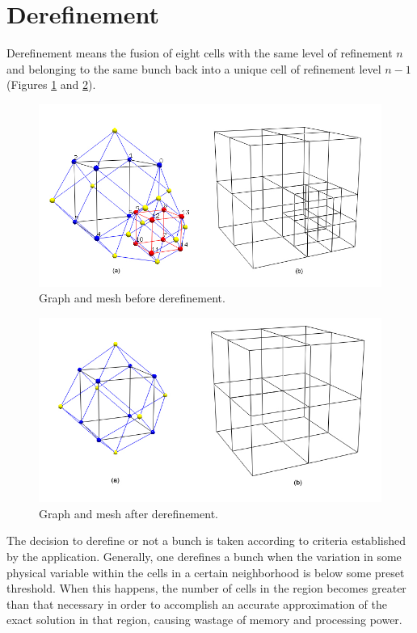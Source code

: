 \section{Derefinement} \label{SEC_DEREFINEMENT}

Derefinement means the fusion of eight cells with the same level of
refinement $n$ and belonging to the same bunch back into a unique
cell of refinement level $n - 1$ (Figures
\ref{FIG_BEFORE_DEREFINEMENT} and \ref{FIG_AFTER_DEREFINEMENT}).

\begin{figure}[H]
    \centering
    \includegraphics[scale=0.40]{../img/refinedGraphAndGrid.jpg}
    \caption{Graph and mesh before derefinement.}
    \label{FIG_BEFORE_DEREFINEMENT}
\end{figure}

\begin{figure}
    \centering
    \includegraphics[scale=0.40]{../img/initialGraphAndGrid.jpg}
    \caption{Graph and mesh after derefinement.}
    \label{FIG_AFTER_DEREFINEMENT}
\end{figure}

The decision to derefine or not a bunch is taken according to
criteria established by the application. Generally, one derefines a
bunch when the variation in some physical variable within the cells
in a certain neighborhood is below some preset threshold. When this
happens, the number of cells in the region becomes greater than that
necessary in order to accomplish an accurate approximation of the
exact solution in that region, causing wastage of memory and
processing power.

